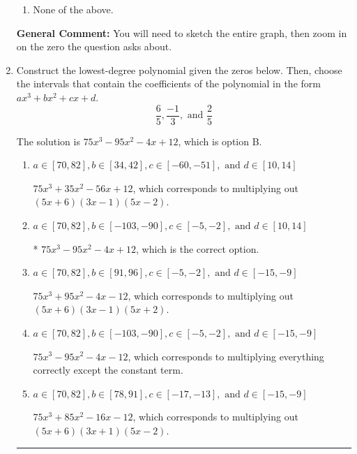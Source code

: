 \documentclass{extbook}[14pt]
\newcommand{\litem}[1]{\item #1

\rule{\textwidth}{0.4pt}}
\begin{document}
\begin{enumerate}
{\begin{enumerate}[label=\Alph*.]
\item None of the above.\end{enumerate}
\textbf{General Comment:} You will need to sketch the entire graph, then zoom in on the zero the question asks about.
}
\litem{
Construct the lowest-degree polynomial given the zeros below. Then, choose the intervals that contain the coefficients of the polynomial in the form $ax^3+bx^2+cx+d$.
\[ \frac{6}{5}, \frac{-1}{3}, \text{ and } \frac{2}{5} \]

The solution is \( 75x^{3} -95 x^{2} -4 x + 12 \), which is option B.\begin{enumerate}[label=\Alph*.]
\item \( a \in [70, 82], b \in [34, 42], c \in [-60, -51], \text{ and } d \in [10, 14] \)

$75x^{3} +35 x^{2} -56 x + 12$, which corresponds to multiplying out $(5x + 6)(3x -1)(5x -2)$.
\item \( a \in [70, 82], b \in [-103, -90], c \in [-5, -2], \text{ and } d \in [10, 14] \)

* $75x^{3} -95 x^{2} -4 x + 12$, which is the correct option.
\item \( a \in [70, 82], b \in [91, 96], c \in [-5, -2], \text{ and } d \in [-15, -9] \)

$75x^{3} +95 x^{2} -4 x -12$, which corresponds to multiplying out $(5x + 6)(3x -1)(5x + 2)$.
\item \( a \in [70, 82], b \in [-103, -90], c \in [-5, -2], \text{ and } d \in [-15, -9] \)

$75x^{3} -95 x^{2} -4 x -12$, which corresponds to multiplying everything correctly except the constant term.
\item \( a \in [70, 82], b \in [78, 91], c \in [-17, -13], \text{ and } d \in [-15, -9] \)

$75x^{3} +85 x^{2} -16 x -12$, which corresponds to multiplying out $(5x + 6)(3x + 1)(5x -2)$.
\end{enumerate}

}
\end{enumerate}
\end{document}
